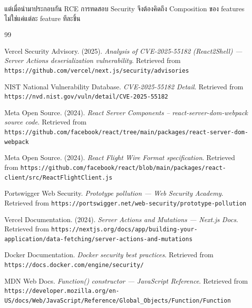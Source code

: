 \documentclass[12pt,oneside]{report}
\begin{document}
แต่เมื่อนำมาประกอบกัน RCE การทดสอบ Security จึงต้องคิดถึง Composition ของ features ไม่ใช่แค่แต่ละ feature ทีละชิ้น

\newpage
\begin{thebibliography}{99}

Vercel Security Advisory. (2025). \textit{Analysis of CVE-2025-55182 (React2Shell) --- Server Actions deserialization vulnerability}. Retrieved from \texttt{https://github.com/vercel/next.js/security/advisories}

NIST National Vulnerability Database. \textit{CVE-2025-55182 Detail}. Retrieved from \texttt{https://nvd.nist.gov/vuln/detail/CVE-2025-55182}

Meta Open Source. (2024). \textit{React Server Components -- react-server-dom-webpack source code}. Retrieved from \texttt{https://github.com/facebook/react/tree/main/packages/react-server-dom-webpack}

Meta Open Source. (2024). \textit{React Flight Wire Format specification}. Retrieved from \texttt{https://github.com/facebook/react/blob/main/packages/react-client/src/ReactFlightClient.js}

Portswigger Web Security. \textit{Prototype pollution --- Web Security Academy}. Retrieved from \texttt{https://portswigger.net/web-security/prototype-pollution}

Vercel Documentation. (2024). \textit{Server Actions and Mutations --- Next.js Docs}. Retrieved from \texttt{https://nextjs.org/docs/app/building-your-application/data-fetching/server-actions-and-mutations}

Docker Documentation. \textit{Docker security best practices}. Retrieved from \texttt{https://docs.docker.com/engine/security/}

MDN Web Docs. \textit{Function() constructor --- JavaScript Reference}. Retrieved from \texttt{https://developer.mozilla.org/en-US/docs/Web/JavaScript/Reference/Global\_Objects/Function/Function}

\end{thebibliography}
\end{document}
